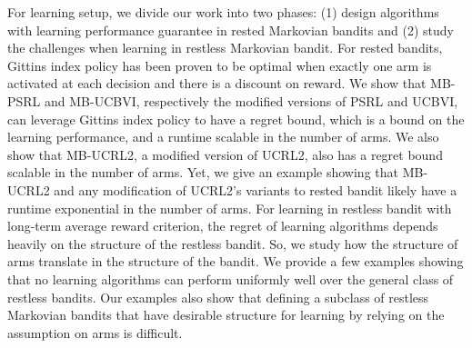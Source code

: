For learning setup, we divide our work into two phases: (1) design algorithms with learning performance guarantee in rested Markovian bandits and (2) study the challenges when learning in restless Markovian bandit.
For rested bandits, Gittins index policy has been proven to be optimal when exactly one arm is activated at each decision and there is a discount on reward.
We show that MB-PSRL and MB-UCBVI, respectively the modified versions of PSRL and UCBVI, can leverage Gittins index policy to have a regret bound, which is a bound on the learning performance, and a runtime scalable in the number of arms. We also show that MB-UCRL2, a modified version of UCRL2, also has a regret bound scalable in the number of arms. Yet, we give an example showing that MB-UCRL2 and any modification of UCRL2’s variants to rested bandit likely have a runtime exponential in the number of arms.
For learning in restless bandit with long-term average reward criterion, the regret of learning algorithms depends heavily on the structure of the restless bandit.
So, we study how the structure of arms translate in the structure of the bandit. We provide a few examples showing that no learning algorithms can perform uniformly well over the general class of restless bandits.
Our examples also show that defining a subclass of restless Markovian bandits that have desirable structure for learning by relying on the assumption on arms is difficult.

